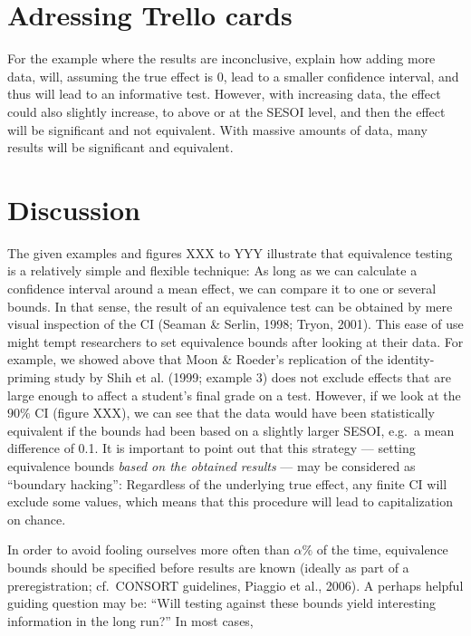 \documentclass[english,man]{apa6}
\theoremstyle{definition}
\theoremstyle{definition}
\theoremstyle{definition}
\theoremstyle{remark}
\begin{document}
\section{Adressing Trello cards}\label{adressing-trello-cards}

For the example where the results are inconclusive, explain how adding
more data, will, assuming the true effect is 0, lead to a smaller
confidence interval, and thus will lead to an informative test. However,
with increasing data, the effect could also slightly increase, to above
or at the SESOI level, and then the effect will be significant and not
equivalent. With massive amounts of data, many results will be
significant and equivalent.

\section{Discussion}\label{discussion}

The given examples and figures XXX to YYY illustrate that equivalence
testing is a relatively simple and flexible technique: As long as we can
calculate a confidence interval around a mean effect, we can compare it
to one or several bounds. In that sense, the result of an equivalence
test can be obtained by mere visual inspection of the CI (Seaman \&
Serlin, 1998; Tryon, 2001). This ease of use might tempt researchers to
set equivalence bounds after looking at their data. For example, we
showed above that Moon \& Roeder's replication of the identity-priming
study by Shih et al. (1999; example 3) does not exclude effects that are
large enough to affect a student's final grade on a test. However, if we
look at the \(90 \%\) CI (figure XXX), we can see that the data would
have been statistically equivalent if the bounds had been based on a
slightly larger SESOI, e.g.~a mean difference of 0.1. It is important to
point out that this strategy --- setting equivalence bounds \emph{based
on the obtained results} --- may be considered as \enquote{boundary
hacking}: Regardless of the underlying true effect, any finite CI will
exclude some values, which means that this procedure will lead to
capitalization on chance.

In order to avoid fooling ourselves more often than \(\alpha \%\) of the
time, equivalence bounds should be specified before results are known
(ideally as part of a preregistration; cf.~CONSORT guidelines, Piaggio
et al., 2006). A perhaps helpful guiding question may be: \enquote{Will
testing against these bounds yield interesting information in the long
run?} In most cases,
\end{document}
